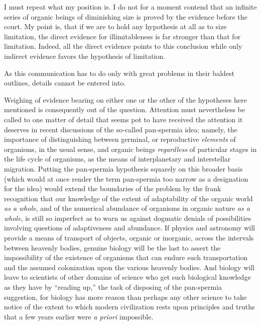 \documentclass[a4paper, 11pt, oneside, polutonikogreek, english]{article}
\begin{document}
I must repeat what my position is. I do not for a moment contend that an infinite series of organic beings of diminishing size is proved by the evidence before the court. My point is, that if we are to hold any hypothesis at all as to size limitation, the direct evidence for illimitableness is far stronger than that for limitation. Indeed, all the direct evidence points to this conclusion while only indirect evidence favors the hypothesis of limitation.

As this communication has to do only with great problems in their baldest outlines, details cannot be entered into.

Weighing of evidence bearing on either one or the other of the hypotheses here mentioned is consequently out of the question. Attention must nevertheless be called to one matter of detail that seems pot to have received the attention it deserves in recent discussions of the so-called pan-spermia idea; namely, the importance of distinguishing between germinal, or reproductive \emph{elements} of organisms, in the usual sense, and organic beings \emph{regardless} of particular stages in the life cycle of organisms, as the means of interplanetary and interstellar migration. Putting the pan-spermia hypothesis squarely on this broader basis (which would at once render the term pan-spermia too narrow as a designation for the idea) would extend the boundaries of the problem by the frank recognition that our knowledge of the extent of adaptability of the organic world \emph{as a whole}, and of the numerical abundance of organisms in organic nature \emph{as a whole}, is still so imperfect as to warn us against dogmatic denials of possibilities involving questions of adaptiveness and abundance. If physics and astronomy will provide a means of transport of objects, organic or inorganic, across the intervals between heavenly bodies, genuine biology will be the last to assert the impossibility of the existence of organisms that can endure such transportation and the assumed colonization upon the various heavenly bodies. And biology will leave to scientists of other domains of science who get such biological knowledge as they have by ``reading up,'' the task of disposing of the pan-spermia suggestion, for biology has more reason than perhaps any other science to take notice of the extent to which modern civilization rests upon principles and truths that a few years earlier were \emph{a priori} impossible.

\subsection{}
\end{document}
